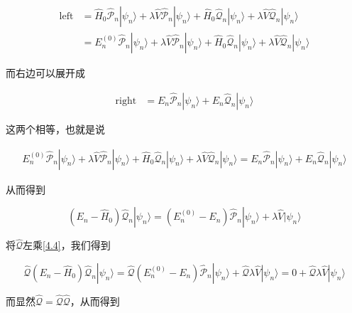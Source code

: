 \begin{equation}
\begin{split}
\text{left} &= \hat{H}_0\hat{\mathcal{P}}_n|\psi_n\rangle + \lambda \hat{V}\hat{\mathcal{P}}_n|\psi_n\rangle + \hat{H}_0\hat{\mathcal{Q}}_n|\psi_n\rangle + \lambda \hat{V}\hat{\mathcal{Q}}_n|\psi_n\rangle\\
&=E_n^{(0)}\hat{\mathcal{P}}_n|\psi_n\rangle + \lambda \hat{V}\hat{\mathcal{P}}_n|\psi_n\rangle + \hat{H}_0\hat{\mathcal{Q}}_n|\psi_n\rangle + \lambda \hat{V}\hat{\mathcal{Q}}_n|\psi_n\rangle
\end{split}
\end{equation}

而右边可以展开成

\begin{equation}
\begin{split}
\text{right} &= E_n\hat{\mathcal{P}}_n|\psi_n\rangle + E_n\hat{\mathcal{Q}}_n|\psi_n\rangle
\end{split}
\end{equation}

这两个相等，也就是说

\begin{equation}
\begin{split}
E_n^{(0)}\hat{\mathcal{P}}_n|\psi_n\rangle + \lambda \hat{V}\hat{\mathcal{P}}_n|\psi_n\rangle + \hat{H}_0\hat{\mathcal{Q}}_n|\psi_n\rangle + \lambda \hat{V}\hat{\mathcal{Q}}_n|\psi_n\rangle = E_n\hat{\mathcal{P}}_n|\psi_n\rangle + E_n\hat{\mathcal{Q}}_n|\psi_n\rangle
\end{split}
\end{equation}

从而得到

\begin{equation}\label{4.4}
(E_n - \hat{H}_0)\hat{\mathcal{Q}}_n|\psi_n\rangle = (E_n^{(0)}-E_n)\hat{\mathcal{P}}_n|\psi_n\rangle+\lambda \hat{V}|\psi_n\rangle
\end{equation}

将$\hat{\mathcal{Q}}$左乘\eqref{4.4}，我们得到

\begin{equation}
\hat{\mathcal{Q}} (E_n - \hat{H}_0)\hat{\mathcal{Q}}_n|\psi_n\rangle= \hat{\mathcal{Q}}(E_n^{(0)}-E_n)\hat{\mathcal{P}}_n|\psi_n\rangle+\hat{\mathcal{Q}}\lambda \hat{V}|\psi_n\rangle = 0 +\hat{\mathcal{Q}}\lambda \hat{V}|\psi_n\rangle
\end{equation}

而显然$\hat{\mathcal{Q}} = \hat{\mathcal{Q}}\hat{\mathcal{Q}}$，从而得到

